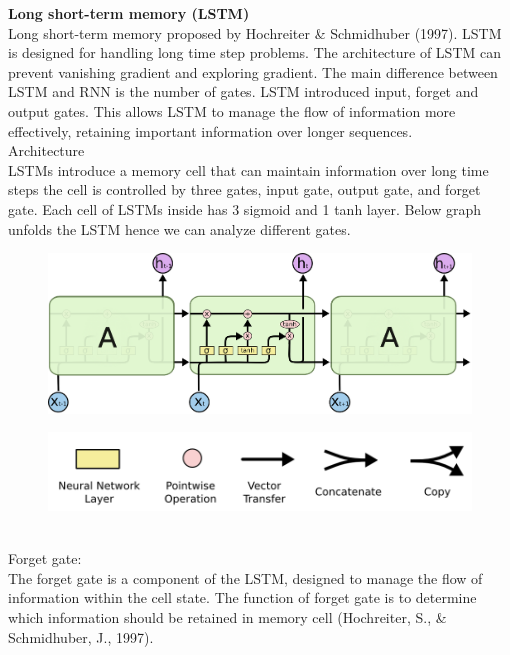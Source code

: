 \documentclass[12pt,a4paper]{article}
\begin{document}
\newpage
\textbf{Long short-term memory (LSTM)}
\\[2ex]
Long short-term memory proposed by Hochreiter \& Schmidhuber (1997). LSTM is designed for handling long time step problems. The architecture of LSTM can prevent vanishing gradient and exploring gradient. The main difference between LSTM and RNN is the number of gates. LSTM introduced input, forget and output gates. This allows LSTM to manage the flow of information more effectively, retaining important information over longer sequences.
\\[2ex]
Architecture
\\[1ex]
LSTMs introduce a memory cell that can maintain information over long time steps the cell is controlled by three gates, input gate, output gate, and forget gate. Each cell of LSTMs inside has 3 sigmoid and 1 tanh layer. Below graph unfolds the LSTM hence we can analyze different gates.
\begin{figure}[!htb]
    \centering
    \includegraphics[width=1\textwidth]{../Pic/lstm1.png} %
\end{figure}
\begin{figure}[!htb]
    \centering
    \includegraphics[width=1\textwidth]{../Pic/lstm2.png} %
\end{figure}
\\
Forget gate:
\\[1ex]
The forget gate is a component of the LSTM, designed to manage the flow of information within the cell state. The function of forget gate is to determine which information should be retained in memory cell (Hochreiter, S., \& Schmidhuber, J., 1997).
\end{document}
